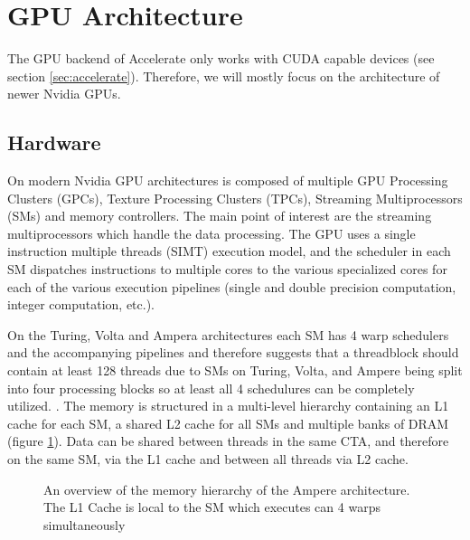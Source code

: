 \section{GPU Architecture}
The GPU backend of Accelerate only works with CUDA capable devices (see section \ref{sec:accelerate}).
Therefore, we will mostly focus on the architecture of newer Nvidia GPUs.

\subsection{Hardware}
On modern Nvidia GPU architectures is composed of multiple GPU Processing Clusters (GPCs), Texture Processing Clusters (TPCs), Streaming Multiprocessors (SMs) and memory controllers.
The main point of interest are the streaming multiprocessors which handle the data processing.
The GPU uses a single instruction multiple threads (SIMT) execution model, and the scheduler in each SM dispatches instructions to multiple cores to the various specialized cores for each of the various execution pipelines (single and double precision computation, integer computation, etc.).

On the Turing, Volta and Ampera architectures each SM has 4 warp schedulers and the accompanying pipelines and therefore \citeauthor{jia2019dissecting} suggests that a threadblock should contain at least 128 threads due to SMs on Turing, Volta, and Ampere being split into four processing blocks so at least all 4 schedulures can be completely utilized. \cite{jia2019dissecting,nvidia2017volta,nvidia2018turing,nvidia2020ampere}.
The memory is structured in a multi-level hierarchy containing an L1 cache for each SM, a shared L2 cache for all SMs and multiple banks of DRAM \cite{nvidia2017volta,nvidia2020ampere} (figure \ref{fig:ampere_architecture}).
Data can be shared between threads in the same CTA, and therefore on the same SM, via the L1 cache and between all threads via L2 cache.

\begin{figure}[!hb]
    \centering
    \caption{
        An overview of the memory hierarchy of the Ampere architecture. The L1 Cache is local to the SM which executes can 4 warps simultaneously 
    }
    \label{fig:ampere_architecture}
\end{figure}

